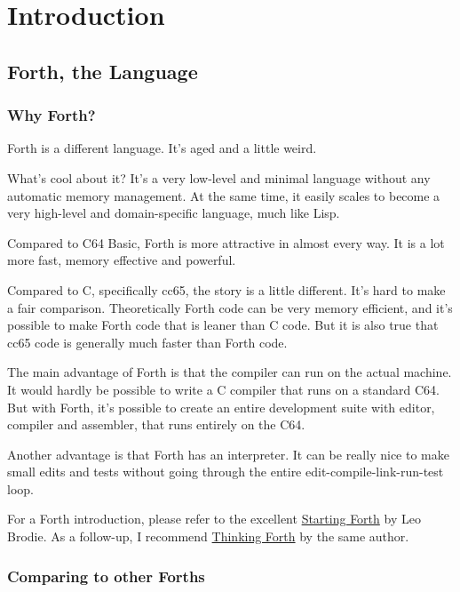 \chapter{Introduction}

\section{Forth, the Language}

\subsection{Why Forth?}

Forth is a different language. It's aged and a little weird.

What's cool about it? It's a very low-level and minimal language without any automatic memory management. At the same time, it easily scales to become a very high-level and domain-specific language, much like Lisp. 

Compared to C64 Basic, Forth is more attractive in almost every way. It is a lot more fast, memory effective and powerful.

Compared to C, specifically cc65, the story is a little different. It's hard to make a fair comparison. Theoretically Forth code can be very memory efficient, and it's possible to make Forth code that is leaner than C code. But it is also true that cc65 code is generally much faster than Forth code.

The main advantage of Forth is that the compiler can run on the actual machine. It would hardly be possible to write a C compiler that runs on a standard C64. But with Forth, it's possible to create an entire development suite with editor, compiler and assembler, that runs entirely on the C64.

Another advantage is that Forth has an interpreter. It can be really nice to make small edits and tests without going through the entire edit-compile-link-run-test loop.

For a Forth introduction, please refer to the excellent \href{http://www.forth.com/starting-forth/}{Starting Forth} by Leo Brodie. As a follow-up, I recommend \href{http://thinking-forth.sourceforge.net/}{Thinking Forth} by the same author.


\subsection{Comparing to other Forths}

